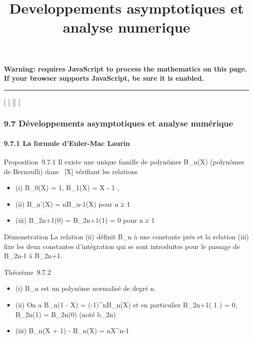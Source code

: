 \documentclass[]{article}
\title{Developpements asymptotiques et analyse numerique}
\author{}
\date{}
\begin{document}
\maketitle

\textbf{Warning: 
requires JavaScript to process the mathematics on this page.\\ If your
browser supports JavaScript, be sure it is enabled.}

\begin{center}\rule{3in}{0.4pt}\end{center}

{[}
{[}
{[}{]}
{[}

\subsubsection{9.7 Développements asymptotiques et analyse numérique}

\paragraph{9.7.1 La formule d'Euler-Mac Laurin}

Proposition~9.7.1 Il existe une unique famille de polynômes
B\_n(X) (polynômes de Bernoulli) dans ~{[}X{]} vérifiant les
relations

\begin{itemize}
\itemsep1pt\parskip0pt
\item
  (i) B\_0(X) = 1, B\_1(X) = X - 1
   ,
\item
  (ii) B\_n'(X) = nB\_n-1(X) pour n ≥ 1
\item
  (iii) B\_2n+1(0) = B\_2n+1(1) = 0 pour n ≥ 1
\end{itemize}

Démonstration La relation (ii) définit B\_n à une constante près
et la relation (iii) fixe les deux constantes d'intégration qui se sont
introduites pour le passage de B\_2n-1 à B\_2n+1.

Théorème~9.7.2

\begin{itemize}
\itemsep1pt\parskip0pt
\item
  (i) B\_n est un polynôme normalisé de degré n.
\item
  (ii) On a B\_n(1 - X) = (-1)^nB\_n(X) et en
  particulier B\_2n+1( 1  ) = 0,
  B\_2n(1) = B\_2n(0) (noté b\_2n)
\item
  (iii) B\_n(X + 1) - B\_n(X) = nX^n-1
\end{itemize}
\end{document}

